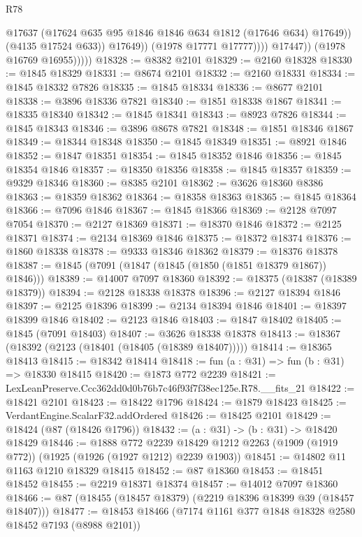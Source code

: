 \begin{lexlean}{R78}
\begin{coremodule}
                              @17637
                              (@17624 @635 @95 @1846 @1846 @634 @1812 (@17646 @634) @17649))
                            (@4135 @17524 @633))
                          @17649))
                      (@1978 @17771 @17777))))
                @17447))
            (@1978 @16769 @16955)))))
@18328 := @8382 @2101
@18329 := @2160 @18328
@18330 := @1845 @18329
@18331 := @8674 @2101
@18332 := @2160 @18331
@18334 := @1845 @18332 @7826
@18335 := @1845 @18334
@18336 := @8677 @2101
@18338 := @3896 @18336 @7821
@18340 := @1851 @18338 @1867
@18341 := @18335 @18340
@18342 := @1845 @18341
@18343 := @8923 @7826
@18344 := @1845 @18343
@18346 := @3896 @8678 @7821
@18348 := @1851 @18346 @1867
@18349 := @18344 @18348
@18350 := @1845 @18349
@18351 := @8921 @1846
@18352 := @1847 @18351
@18354 := @1845 @18352 @1846
@18356 := @1845 @18354 @1846
@18357 := @18350 @18356
@18358 := @1845 @18357
@18359 := @9329 @18346
@18360 := @8385 @2101
@18362 := @3626 @18360 @8386
@18363 := @18359 @18362
@18364 := @18358 @18363
@18365 := @1845 @18364
@18366 := @7096 @1846
@18367 := @1845 @18366
@18369 := @2128 @7097 @7054
@18370 := @2127 @18369
@18371 := @18370 @1846
@18372 := @2125 @18371
@18374 := @2134 @18369 @1846
@18375 := @18372 @18374
@18376 := @1860 @18338
@18378 := @9333 @18346 @18362
@18379 := @18376 @18378
@18387 := @1845 (@7091 (@1847 (@1845 (@1850 (@1851 @18379 @1867)) @1846)))
@18389 := @14007 @7097 @18360
@18392 := @18375 (@18387 (@18389 @18379))
@18394 := @2128 @18338 @18378
@18396 := @2127 @18394 @1846
@18397 := @2125 @18396
@18399 := @2134 @18394 @1846
@18401 := @18397 @18399 @1846
@18402 := @2123 @1846
@18403 := @1847 @18402
@18405 := @1845 (@7091 @18403)
@18407 := @3626 @18338 @18378
@18413 := @18367 (@18392 (@2123 (@18401 (@18405 (@18389 @18407)))))
@18414 := @18365 @18413
@18415 := @18342 @18414
@18418 := fun (a : @31) => fun (b : @31) => @18330 @18415
@18420 := @1873 @772 @2239
@18421 := LexLeanPreserve.Ccc362dd0d0b76b7c46f93f7f38ec125e.R78.__fits_21
@18422 := @18421 @2101
@18423 := @18422 @1796
@18424 := @1879 @18423
@18425 := VerdantEngine.ScalarF32.addOrdered
@18426 := @18425 @2101
@18429 := @18424 (@87 (@18426 @1796))
@18432 := (a : @31) -> (b : @31) -> @18420 @18429
@18446 := @1888
    @772
    @2239
    @18429
    @1212
    @2263
    (@1909 (@1919 @772))
    (@1925 (@1926 (@1927 @1212) @2239 @1903))
@18451 := @14802 @11 @1163 @1210 @18329 @18415
@18452 := @87 @18360
@18453 := @18451 @18452
@18455 := @2219 @18371 @18374
@18457 := @14012 @7097 @18360
@18466 := @87 (@18455 (@18457 @18379) (@2219 @18396 @18399 @39 (@18457 @18407)))
@18477 := @18453 @18466 (@7174 @1161 @377 @1848 @18328 @2580 @18452 @7193 (@8988 @2101))

\end{coremodule}
\end{lexlean}

